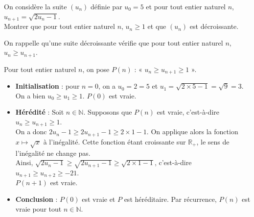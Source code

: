\documentclass[11pt,fleqn]{book} %
\begin{document}
\begin{exercise}
On considère la suite $(u_n)$ définie par $u_0=5$ et pour tout entier naturel $n$, $u_{n+1}=\sqrt{2u_n-1}$. \\Montrer que pour tout entier naturel $n$, $u_n \geqslant 1$ et que $(u_n)$ est décroissante.\end{exercise}


\begin{solution}
On rappelle qu'une suite décroissante vérifie que pour tout entier naturel $n$, $u_n \geqslant u_{n+1}$.

Pour tout entier naturel $n$, on pose $P(n)$ : « $u_n \geqslant u_{n+1} \geqslant 1$ ».

\begin{itemize}
\item \textbf{Initialisation} : pour $n=0$, on a $u_0=2=5$ et $u_1=\sqrt{2\times 5 -1}=\sqrt{9}=3$. On a bien  $u_0 \geqslant u_{1} \geqslant 1$. $P(0)$ est vraie.
\item \textbf{Hérédité} : Soit $n\in\mathbb{N}$. Supposons que $P(n)$ est vraie, c'est-à-dire $u_n \geqslant u_{n+1} \geqslant 1$.\\ On a donc $2u_n-1\geqslant 2u_{n+1}-1 \geqslant 2 \times 1 -1$. On applique alors la fonction $x\mapsto \sqrt{x}$ à l'inégalité. Cette fonction étant croissante sur $\mathbb{R}_+$, le sens de l'inégalité ne change pas. \\Ainsi, $\sqrt{2u_n-1} \geqslant \sqrt{2u_{n+1}-1} \geqslant \sqrt{2\times 1-1}$, c'est-à-dire $u_{n+1} \geqslant u_{n+2} \geqslant -21$.\\ $P(n+1)$ est vraie.
\item \textbf{Conclusion} : $P(0)$ est vraie et $P$ est héréditaire. Par récurrence, $P(n)$ est vraie pour tout $n\in\mathbb{N}$.
\end{itemize}\end{solution}
\end{document}
